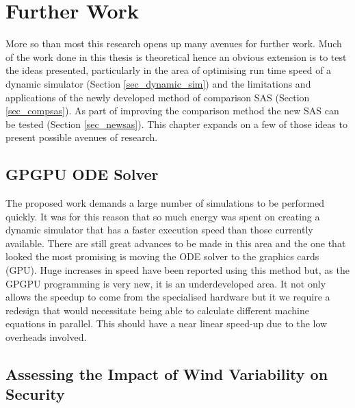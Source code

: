 \documentclass[a4paper,oneside,12pt]{report}
\begin{document}







\chapter{Further Work}

More so than most this research opens up many avenues for further work. Much of the work done in this thesis is theoretical hence an obvious extension is to test the ideas presented, particularly in the area of optimising run time speed of a dynamic simulator (Section \ref{sec_dynamic_sim}) and the limitations and applications of the newly developed method of comparison SAS (Section \ref{sec_compsas}). As part of improving the comparison method the new SAS can be tested (Section \ref{sec_newsas}). This chapter expands on a few of those ideas to present possible avenues of research.

\section{GPGPU ODE Solver}

The proposed work demands a large number of simulations to be performed quickly. It was for this reason that so much energy was spent on creating a dynamic simulator that has a faster execution speed than those currently available. There are still great advances to be made in this area and the one that looked the most promising is moving the ODE solver to the graphics cards (GPU). Huge increases in speed have been reported using this method but, as the GPGPU programming is very new, it is an underdeveloped area. It not only allows the speedup to come from the specialised hardware but it we require a redesign that would necessitate being able to calculate different machine equations in parallel. This should have a near linear speed-up due to the low overheads involved.

\section{Assessing the Impact of Wind Variability on Security}
\end{document}
